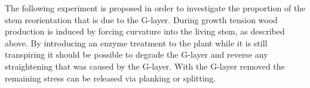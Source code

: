 The following experiment is proposed in order to investigate the proportion of
the stem reorientation that is due to the G-layer. During growth tension wood
production is induced by forcing curvature into the living stem, as described
above. By introducing an enzyme treatment to the plant while it is still
transpiring it should be possible to degrade the G-layer and reverse any straightening that was caused
by the G-layer. With the G-layer removed the remaining stress can be released
via planking or splitting.